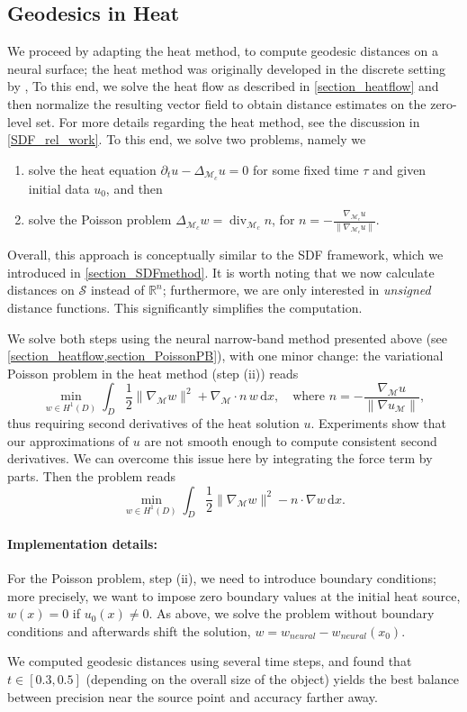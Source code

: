 \documentclass[12pt,openany]{book}
\newcommand{\R}{\mathbb{R}}
\def\S{\mathcal{S}}
\theoremstyle{plainnormal}
\theoremstyle{remark}
\begin{document}
\subsection{Geodesics in Heat}\label{subsec:geod_distances}
We proceed by adapting the heat method, to compute geodesic distances on a neural surface; the heat method was originally developed in the discrete setting by \cite{Crane_2013}, To this end, we solve the heat flow as described in \cref{section_heatflow} and then normalize the resulting vector field to obtain distance estimates on the zero-level set. For more details regarding the heat method, see the discussion in \cref{SDF_rel_work}. \newpage
To this end, we solve two problems, namely we
\begin{enumerate}
    \item solve the heat equation $\partial_t u - \Delta_{\mathcal{M}_c} u = 0$ for some fixed time $\tau$ and given initial data $u_0$, and then
    \item solve the Poisson problem $\Delta_{\mathcal{M}_c} w = \operatorname{div}_{\mathcal{M}_c}  n$, for $ n = -\frac{\nabla_{\mathcal{M}_c} u}{\|\nabla_{\mathcal{M}_c} u\|}$.
\end{enumerate}
Overall, this approach is conceptually similar to the SDF framework, which we introduced in \cref{section_SDFmethod}. 
It is worth noting that we now calculate distances on $\S$ instead of $\R^n$; furthermore, we are only interested in \emph{unsigned} distance functions. This significantly simplifies the computation.\par
We solve both steps using the neural narrow-band method presented above (see \cref{section_heatflow,section_PoissonPB}), with one minor change: the variational Poisson problem in the heat method (step (ii)) reads
$$\min_{w\in H^1(D)}\int_D \frac{1}{2}\|\nabla_\mathcal{M}w\|^2 + \nabla_{\mathcal{M}} \cdot n \, w \,\mathrm{d}x, \quad \text{where } n = - \frac{\nabla_{\mathcal{M}} u}{\|\nabla u_{\mathcal{M}}\|},$$
thus requiring second derivatives of the heat solution $u$. Experiments show that our approximations of $u$ are not smooth enough to compute consistent second derivatives. We can overcome this issue here by integrating the force term by parts. Then the problem reads 
$$\min_{w\in H^1(D)}\int_D \frac{1}{2}\|\nabla_\mathcal{M}w\|^2 - n\cdot \nabla w \,\mathrm{d}x.$$
\paragraph{Implementation details:}
For the Poisson problem, step (ii), we need to introduce boundary conditions; more precisely, we want to impose zero boundary values at the initial heat source, $w(x) = 0$ if $u_0(x) \neq 0 $. As above, we solve the problem without boundary conditions and afterwards shift the solution, $w = w_{neural} - w_{neural}(x_0).$\par
We computed geodesic distances using several time steps, and found that \( t \in [0.3, 0.5] \) (depending on the overall size of the object) yields the best balance between precision near the source point and accuracy farther away.
\end{document}

